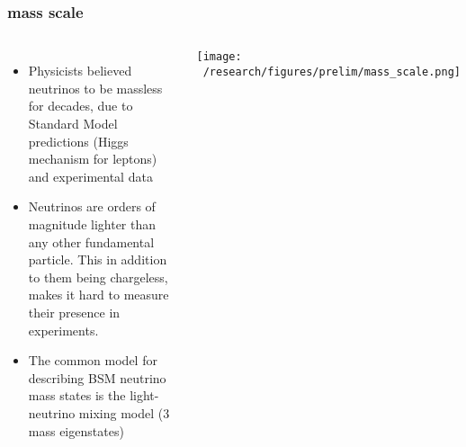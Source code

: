\documentclass{beamer}
\begin{document}
	\begin{frame}
		\frametitle{mass scale}
		\begin{columns}[c] %
			
			\begin{itemize}
				\setlength\itemsep{2em}
				\item Physicists  believed neutrinos to be massless for decades, due to Standard Model predictions (Higgs mechanism for leptons) and experimental data
				\item Neutrinos are orders of magnitude lighter than any other fundamental particle. This in addition to them being chargeless, makes it hard to measure their presence in experiments.
				\item The common model for describing BSM neutrino mass states is the light-neutrino mixing model (3 mass eigenstates)
				
				
			\end{itemize}
			
			\texttt{[image: ~/research/figures/prelim/mass\_scale.png]}
		
			
		\end{columns}
	\end{frame}
		
\end{document}
